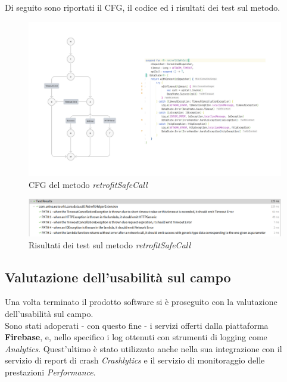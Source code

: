 \documentclass{natourDoc}
\begin{document}
\newpage
Di seguito sono riportati il CFG, il codice ed i risultati dei test sul metodo.
\begin{figure}[!htbp]
	\centering
	\includegraphics[width=\textwidth]{code/retrofit-whitebox.pdf}
	\caption{CFG del metodo \textit{retrofitSafeCall}}
\end{figure}
\FloatBarrier



\begin{figure}[!htbp]
	\centering
	\includegraphics[width=\textwidth]{code/WHITEBOX-retro.png}
	\caption{Risultati dei test sul metodo \textit{retrofitSafeCall}}
\end{figure}

\newpage
\subsection{Valutazione dell'usabilità sul campo}
Una volta terminato il prodotto software si è proseguito con la valutazione dell'usabilità sul campo. \\
Sono stati adoperati - con questo fine - i servizi offerti dalla piattaforma \textbf{Firebase}, e, nello specifico i 
log ottenuti con strumenti di logging come \textit{Analytics}. Quest'ultimo è stato utilizzato anche nella sua integrazione 
con il servizio di report di crash \textit{Crashlytics} e il servizio di monitoraggio delle prestazioni \textit{Performance}.
\end{document}
